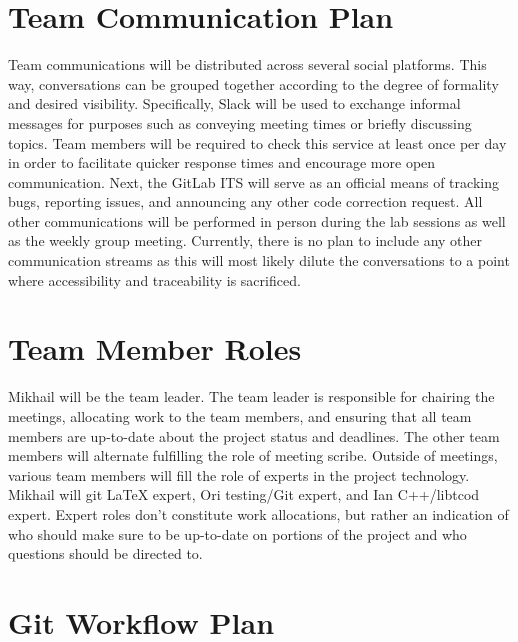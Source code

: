 \documentclass{article}
\begin{document}
\section{Team Communication Plan}

Team communications will be distributed across several social platforms. This way, conversations can be grouped together according to the degree of formality and desired visibility.  Specifically, Slack will be used to exchange informal messages for purposes such as conveying meeting times or briefly discussing topics.  Team members will be required to check this service at least once per day in order to facilitate quicker response times and encourage more open communication.  Next, the GitLab ITS will serve as an official means of tracking bugs, reporting issues, and announcing any other code correction request.  All other communications will be performed in person during the lab sessions as well as the weekly group meeting.  Currently, there is no plan to include any other communication streams as this will most likely dilute the conversations to a point where accessibility and traceability is sacrificed.

\section{Team Member Roles}

Mikhail will be the team leader. The team leader is responsible for chairing the meetings, allocating work to the team members, and ensuring that all team members are up-to-date about the project status and deadlines. The other team members will alternate fulfilling the role of meeting scribe. Outside of meetings, various team members will fill the role of experts in the project technology. Mikhail will git LaTeX expert, Ori testing/Git expert, and Ian C++/libtcod expert. Expert roles don't constitute work allocations, but rather an indication of who should make sure to be up-to-date on portions of the project and who questions should be directed to.

\section{Git Workflow Plan}
\end{document}

